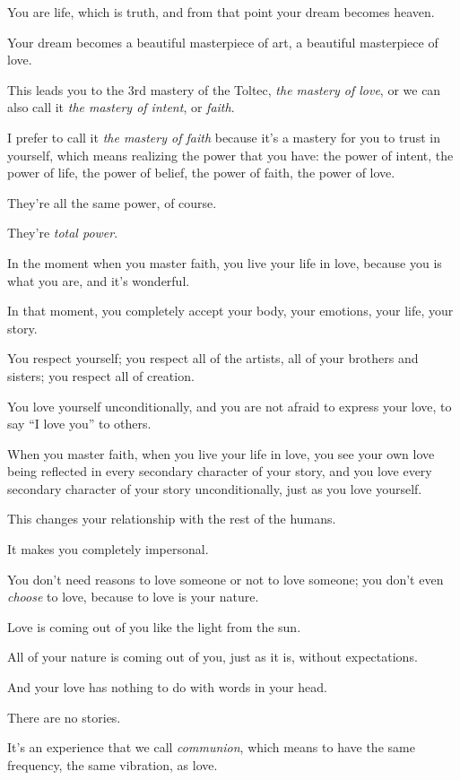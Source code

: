 \documentclass{article}
\numberwithin{equation}{section}
\begin{document}
You are life, which is truth, and from that point your dream becomes heaven.

Your dream becomes a beautiful masterpiece of art, a beautiful masterpiece of love.

This leads you to the 3rd mastery of the Toltec, \textit{the mastery of love}, or we can also call it \textit{the mastery of intent}, or \textit{faith}.

I prefer to call it \textit{the mastery of faith} because it's a mastery for you to trust in yourself, which means realizing the power that you have: the power of intent, the power of life, the power of belief, the power of faith, the power of love.

They're all the same power, of course.

They're \textit{total power}.

%
In the moment when you master faith, you live your life in love, because you is what you are, and it's wonderful.

In that moment, you completely accept your body, your emotions, your life, your story.

You respect yourself; you respect all of the artists, all of your brothers and sisters; you respect all of creation.

You love yourself unconditionally, and you are not afraid to express your love, to say ``I love you'' to others.

When you master faith, when you live your life in love, you see your own love being reflected in every secondary character of your story, and you love every secondary character of your story unconditionally, just as you love yourself.

%
This changes your relationship with the rest of the humans.

It makes you completely impersonal.

You don't need reasons to love someone or not to love someone; you don't even \textit{choose} to love, because to love is your nature.

Love is coming out of you like the light from the sun.

All of your nature is coming out of you, just as it is, without expectations.

And your love has nothing to do with words in your head.

There are no stories.

It's an experience that we call \textit{communion}, which means to have the same frequency, the same vibration, as love.
\end{document}
